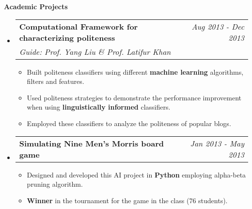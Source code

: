 \documentclass[letterpaper,11pt]{article}
\makeatletter
\newcommand{\resitem}[1]{\item[\ding{226}] #1 \vspace{-2pt}}
\newcommand{\resheading}[1]{{\large \colorbox{mygrey}{\begin{minipage}{\textwidth}{\textbf{#1 \vphantom{p\^{E}}}}\end{minipage}}}}
\newcommand{\ressubheading}[4]{
\begin{tabular*}{7.0in}{l@{\extracolsep{\fill}}r}
		\textbf{#1} & #2 \\
		\textit{#3} & \textit{#4} \\
\end{tabular*}\vspace{-6pt}}
\newcommand{\reslineheading}[2]{
\begin{tabular*}{7.0in}{l@{\extracolsep{\fill}}r}
		\textbf{#1} & #2 \\
\end{tabular*}\vspace{-6pt}}
\makeatother
\begin{document}
\resheading{Academic Projects}
\begin{itemize}


\item
	\ressubheading{Computational Framework for characterizing politeness}{\textit{Aug 2013 - Dec 2013}}{Guide: Prof. Yang Liu \& Prof. Latifur Khan}{}
	\begin{itemize}
		\resitem{Built politeness classifiers using different \textbf{machine learning} algorithms, filters and features.}
        \resitem{Used politeness strategies to demonstrate the performance improvement when using \textbf{linguistically informed} classifiers.}
        \resitem{Employed these classifiers to analyze the politeness of popular blogs.}
	\end{itemize}

\item
	\reslineheading{Simulating Nine Men's Morris board game}{\textit{Jan 2013 - May 2013}}
	\begin{itemize}
		\resitem{Designed and developed this AI project in \textbf{Python} employing alpha-beta pruning algorithm.}
		\resitem{\textbf{Winner} in the tournament for the game in the class (76 students).}
	\end{itemize}



\end{itemize}
\end{document}
